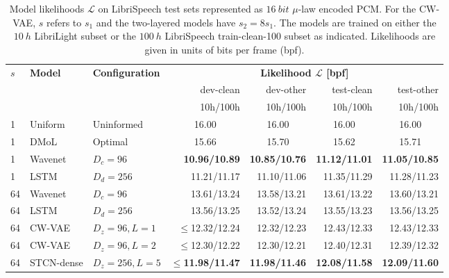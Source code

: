 \begin{table*}[t]
    \centering
    \begin{adjustbox}{center, totalheight=0.182\paperheight}
    \begin{tabular}{lll|rrrr}  %
        \toprule
        $s$ & \bfseries Model                   & \bfseries Configuration       & \multicolumn{4}{c}{\bfseries Likelihood $\mathcal{L}$ [bpf]} \\
            & & & dev-clean & dev-other & test-clean & test-other\\
            & & & 10h/100h & 10h/100h & 10h/100h & 10h/100h\\
        \midrule
        1 & Uniform             & Uninformed     & \multicolumn{1}{c}{16.00} & \multicolumn{1}{c}{16.00} & \multicolumn{1}{c}{16.00} & \multicolumn{1}{c}{16.00} \\
        1 & DMoL                & Optimal        & \multicolumn{1}{c}{15.66} & \multicolumn{1}{c}{15.70} & \multicolumn{1}{c}{15.62} & \multicolumn{1}{c}{15.71}\\   %
        \midrule
        1 & Wavenet             & $D_c=96$       & \bfseries 10.96/10.89 & \bfseries 10.85/10.76 & \bfseries 11.12/11.01 & \bfseries 11.05/10.85 \\
        1 & LSTM                & $D_d=256$      & 11.21/11.17 & 11.10/11.06 & 11.35/11.29 & 11.28/11.23 \\  %
        \midrule
        64 & Wavenet            & $D_c=96$       & 13.61/13.24 & 13.58/13.21 & 13.61/13.22 & 13.60/13.21 \\  %
        64 & LSTM               & $D_d=256$      & 13.56/13.25 & 13.52/13.24 & 13.55/13.23 & 13.56/13.25 \\  %
        64 & CW-VAE             & $D_z=96,L=1$   & $\leq$12.32/12.24 & 12.32/12.23 & 12.43/12.33 & 12.43/12.33 \\
        64 & CW-VAE             & $D_z=96,L=2$   & $\leq$12.30/12.22 & 12.30/12.21 & 12.40/12.31 & 12.39/12.32 \\
        64 & STCN-dense         & $D_z=256,L=5$  & $\leq$\bfseries 11.98/11.47 & \bfseries 11.98/11.46 & \bfseries 12.08/11.58 & \bfseries 12.09/11.60 \\  %
        \bottomrule
    \end{tabular}
    \end{adjustbox}
    \caption{
    Model likelihoods $\mathcal{L}$ on LibriSpeech test sets represented as $\SI{16}{bit}$ $\mu$-law encoded PCM.
    For the CW-VAE, $s$ refers to $s_1$ and the two-layered models have $s_2=8s_1$.
    The models are trained on either the $\SI{10}{h}$ LibriLight subset or the $\SI{100}{h}$ LibriSpeech \textrm{train-clean-100} subset as indicated.
    Likelihoods are given in units of bits per frame (bpf).
    }
    \label{tab: likelihoods librispeech}
\end{table*}
